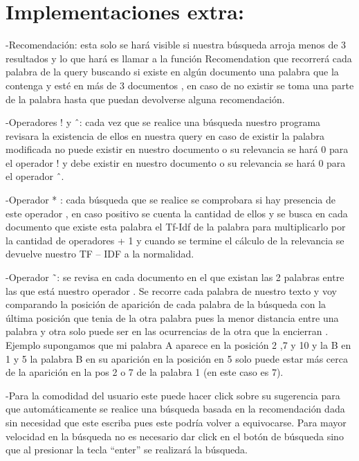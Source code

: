 \documentclass[12pt]{article}
\begin{document}
\section*{Implementaciones extra:}

-Recomendación: esta solo se hará visible si nuestra búsqueda arroja menos de 3
resultados y lo que hará es llamar a la función Recomendation que recorrerá cada
palabra de la query buscando si existe en algún documento una palabra que la
contenga y esté en más de 3 documentos , en caso de no existir se toma una parte de
la palabra hasta que puedan devolverse alguna recomendación.

-Operadores ! y \^\ : cada vez que se realice una búsqueda nuestro programa revisara la
existencia de ellos en nuestra query en caso de existir la palabra modificada no puede
existir en nuestro documento o su relevancia se hará 0 para el operador ! y debe existir
en nuestro documento o su relevancia se hará 0 para el operador \^\ .

-Operador * : cada búsqueda que se realice se comprobara si hay presencia de este
operador , en caso positivo se cuenta la cantidad de ellos y se busca en cada
documento que existe esta palabra el Tf-Idf de la palabra para multiplicarlo por la
cantidad de operadores + 1 y cuando se termine el cálculo de la relevancia se
devuelve nuestro TF – IDF a la normalidad.

-Operador \~\ : se revisa en cada documento en el que existan las 2 palabras entre las
que está nuestro operador . Se recorre cada palabra de nuestro texto y voy
comparando la posición de aparición de cada palabra de la búsqueda con la última
posición que tenia de la otra palabra pues la menor distancia entre una palabra y otra
solo puede ser en las ocurrencias de la otra que la encierran . Ejemplo supongamos
que mi palabra A aparece en la posición 2 ,7 y 10 y la B en 1 y 5 la palabra B en su
aparición en la posición en 5 solo puede estar más cerca de la aparición en la pos 2 o 7
de la palabra 1 (en este caso es 7).

-Para la comodidad del usuario este puede hacer click sobre su sugerencia para que
automáticamente se realice una búsqueda basada en la recomendación dada sin
necesidad que este escriba pues este podría volver a equivocarse.
Para mayor velocidad en la búsqueda no es necesario dar click en el botón de
búsqueda sino que al presionar la tecla “enter” se realizará la búsqueda.

\newpage
\end{document}
